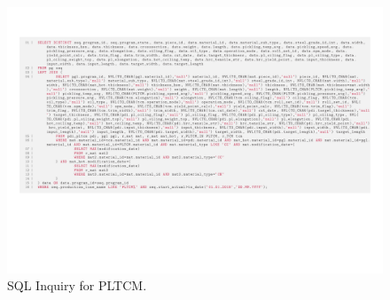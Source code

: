 \begin{landscape}
	\begin{figure}[ht]
		\centering
		\hspace*{-2cm}
		\includegraphics[width=1.7\textwidth]{../database_inquiries/PLTCM.pdf}
		\vspace*{-6cm}
		\caption{SQL Inquiry for PLTCM.}
		\label{figure-supplements-PLTCM-SQL}
	\end{figure}
\end{landscape}
